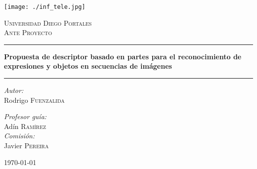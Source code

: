 \documentclass[a4paper,12pt]{article}
\begin{document}
%
\begin{titlepage}
\begin{center}

\texttt{[image: ./inf\_tele.jpg]}

\textsc{\LARGE Universidad Diego Portales}\\[1.5cm]

\textsc{\Large Ante Proyecto}\\[0.5cm]

\rule{1\textwidth}{.4pt}

{ \huge \bfseries Propuesta de descriptor basado en partes para el reconocimiento de expresiones y objetos en secuencias de imágenes \\[0.4cm] }

\rule{1\textwidth}{.4pt}\newline\newline\newline\newline
\begin{minipage}{0.4\textwidth}
\begin{flushleft} \large
\emph{Autor:}\\
Rodrigo \textsc{Fuenzalida}
\end{flushleft}
\end{minipage}
\begin{minipage}{0.4\textwidth}
\begin{flushright} \large
\emph{Profesor guía:} \\
Adín \textsc{Ramírez}\\
\emph{Comisión:} \\
Javier \textsc{Pereira}
\end{flushright}
\end{minipage}

\vfill

{\large \today}

\end{center}
\end{titlepage}
\newpage
\end{document}

